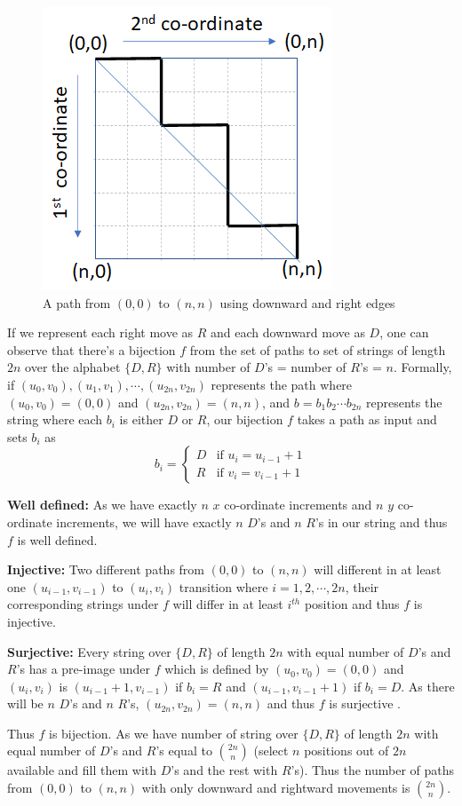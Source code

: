\begin{figure}[h!]
    \centering
    \includegraphics[width=0.4\linewidth]{images/sample-path.png}
    \caption{A path from $(0,0)$ to $(n,n)$ using downward and right edges}
    \label{fig:sample-path}
\end{figure}

If we represent each right move as $R$ and each downward move as $D$, one can observe that there's a bijection $f$ from the set of paths to set of strings of length $2n$ over the alphabet $\{D,R\}$ with number of $D$'s = number of $R$'s = $n$. Formally, if $(u_0,v_0), (u_1,v_1),\cdots,(u_{2n},v_{2n})$ represents the path where $(u_0,v_0)=(0,0)$ and $(u_{2n},v_{2n})=(n,n)$, and $b=b_1b_2\cdots b_{2n}$ represents the string where each $b_i$ is either $D$ or $R$, our bijection $f$ takes a path as input and sets $b_i$ as
$$b_i=\begin{cases}
D &\mbox{if } u_i = u_{i-1}+1\\
R &\mbox{if } v_i = v_{i-1}+1
\end{cases}$$
\begin{description}
\item \textbf{Well defined:} As we have exactly $n$ $x$ co-ordinate increments and $n$ $y$ co-ordinate increments, we will have exactly $n$ $D$'s and $n$ $R$'s in our string and thus $f$ is well defined.
\item \textbf{Injective:} Two different paths from $(0,0)$ to $(n,n)$ will different in at least one $(u_{i-1},v_{i-1})$ to $(u_i,v_i)$ transition where $i=1,2,\cdots,2n$, their corresponding strings under $f$ will differ in at least $i^{th}$ position and thus $f$ is injective.
\item \textbf{Surjective:} Every string over $\{D,R\}$ of length $2n$ with equal number of $D$'s and $R$'s has a pre-image under $f$ which is defined by $(u_0,v_0)=(0,0)$ and $(u_i,v_i)$ is $(u_{i-1}+1,v_{i-1})$ if $b_i=R$ and $(u_{i-1},v_{i-1}+1)$ if $b_i=D$. As there will be $n$ $D$'s and $n$ $R$'s, $(u_{2n},v_{2n})=(n,n)$ and thus $f$ is surjective .
\end{description} 
Thus $f$ is bijection. As we have number of string over $\{D,R\}$ of length $2n$ with equal number of $D$'s and $R$'s equal to $\binom{2n}{n}$ (select $n$ positions out of $2n$ available and fill them with $D$'s and the rest with $R$'s). Thus the number of paths from $(0,0)$ to $(n,n)$ with only downward and rightward movements is $\binom{2n}{n}$.

